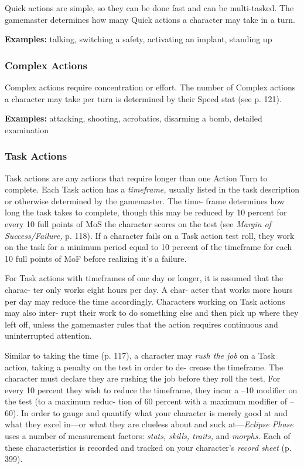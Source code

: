 Quick actions are simple, so they can be done fast and 
can be multi-tasked. The gamemaster determines how 
many Quick actions a character may take in a turn.

\textbf{Examples:} talking, switching a safety, activating an 
implant, standing up

\subsubsection{Complex Actions}

Complex actions require concentration or 
effort. The number of Complex actions a 
character may take per turn is determined 
by their Speed stat (see p. 121).

\textbf{Examples:} attacking, shooting, acrobatics, 
disarming a bomb, detailed examination

\subsubsection{Task Actions}

Task actions are any actions that require 
longer than one Action Turn to complete. 
Each Task action has a \textit{timeframe,} usually 
listed in the task description or otherwise 
determined by the gamemaster. The time-
frame determines how long the task takes 
to complete, though this may be reduced by 
10 percent for every 10 full points of MoS 
the character scores on the test (see \textit{Margin }
\textit{of Success/Failure,} p. 118). If a character 
fails on a Task action test roll, they work 
on the task for a minimum period equal to 
10 percent of the timeframe for each 10 full 
points of MoF before realizing it's a failure.

For Task actions with timeframes of one 
day or longer, it is assumed that the charac-
ter only works eight hours per day. A char-
acter that works more hours per day may 
reduce the time accordingly. Characters 
working on Task actions may also inter-
rupt their work to do something else and 
then pick up where they left off, unless the 
gamemaster rules that the action requires 
continuous and uninterrupted attention.

Similar to taking the time (p. 117), a 
character may \textit{rush the job} on a Task action, 
taking a penalty on the test in order to de-
crease the timeframe. The character must 
declare they are rushing the job before they 
roll the test. For every 10 percent they wish 
to reduce the timeframe, they incur a –10 
modifier on the test (to a maximum reduc-
tion of 60 percent with a maximum modifier 
of –60).
In order to gauge and quantify what your 
character is merely good at and what they 
excel in—or what they are clueless about 
and suck at—\textit{Eclipse Phase} uses a number 
of measurement factors: \textit{stats, skills, traits,} 
and  \textit{morphs.} Each of these characteristics 
is recorded and tracked on your character's 
\textit{record sheet} (p. 399).

